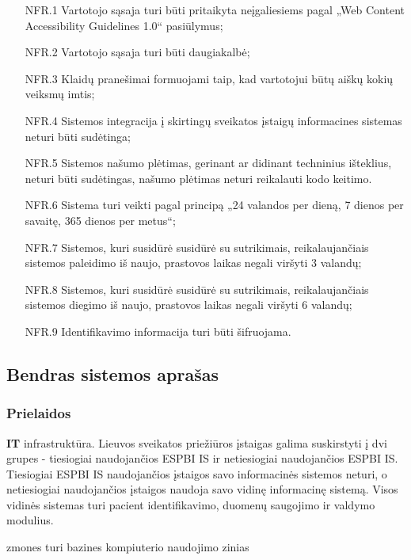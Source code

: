 \begin{itemize}
    \item [NFR.1] Vartotojo sąsaja turi būti pritaikyta neįgaliesiems pagal „Web Content Accessibility Guidelines 1.0“ pasiūlymus;
    \item [NFR.2] Vartotojo sąsaja turi būti daugiakalbė;
    \item [NFR.3] Klaidų pranešimai formuojami taip, kad vartotojui būtų aiškų kokių veiksmų imtis;
    \item [NFR.4] Sistemos integracija į skirtingų sveikatos įstaigų informacines sistemas neturi būti sudėtinga;
    \item [NFR.5] Sistemos našumo plėtimas, gerinant ar didinant techninius išteklius, neturi būti sudėtingas, našumo plėtimas neturi reikalauti kodo keitimo.
    \item [NFR.6] Sistema turi veikti pagal principą „24 valandos per dieną, 7 dienos per savaitę, 365 dienos per metus“;
    \item [NFR.7] Sistemos, kuri susidūrė susidūrė su sutrikimais, reikalaujančiais sistemos paleidimo iš naujo, prastovos laikas negali viršyti 3 valandų;
    \item [NFR.8] Sistemos, kuri susidūrė susidūrė su sutrikimais, reikalaujančiais sistemos diegimo iš naujo, prastovos laikas negali viršyti 6 valandų;
    \item [NFR.9] Identifikavimo informacija turi būti šifruojama.
\end{itemize}

\subsection{Bendras sistemos aprašas}
\subsubsection{Prielaidos}
\textbf{IT} infrastruktūra. Lieuvos sveikatos priežiūros įstaigas galima suskirstyti į dvi grupes - tiesiogiai naudojančios ESPBI IS ir netiesiogiai naudojančios ESPBI IS. Tiesiogiai ESPBI IS naudojančios įstaigos savo informacinės sistemos neturi, o netiesiogiai naudojančios įstaigos naudoja savo vidinę informacinę sistemą. Visos vidinės sistemas turi pacient identifikavimo, duomenų saugojimo ir valdymo modulius.

zmones turi bazines kompiuterio naudojimo zinias